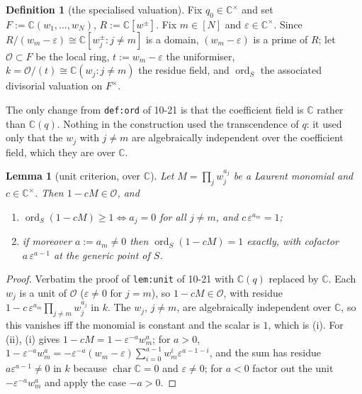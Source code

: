 \documentclass[11pt]{article}
\newtheorem{lem}[thm]{Lemma}
\theoremstyle{definition}
\newtheorem{defn}[thm]{Definition}
\theoremstyle{remark}
\DeclareMathOperator{\ord}{ord}
\begin{document}
\begin{defn}[the specialised valuation]\label{def:ord}
Fix $q_0\in\mathbb{C}^{\times}$ and set $F:=\mathbb{C}(w_1,\dots,w_N)$,
$R:=\mathbb{C}[w^{\pm}]$.  Fix $m\in[N]$ and $\varepsilon\in\mathbb{C}^{\times}$.  Since
$R/(w_m-\varepsilon)\cong\mathbb{C}[w_j^{\pm}:j\ne m]$ is a domain, $(w_m-\varepsilon)$ is
a prime of $R$; let $\mathcal{O}\subset F$ be the local ring, $t:=w_m-\varepsilon$ the
uniformiser, $k=\mathcal{O}/(t)\cong\mathbb{C}(w_j:j\ne m)$ the residue field, and
$\ord_S$ the associated divisorial valuation on $F^{\times}$.
\end{defn}

The only change from \texttt{def:ord} of 10-21 is that the coefficient field is
$\mathbb{C}$ rather than $\mathbb{C}(q)$.  Nothing in the construction used the
transcendence of $q$: it used only that the $w_j$ with $j\ne m$ are algebraically
independent over the coefficient field, which they are over $\mathbb{C}$.

\begin{lem}[unit criterion, over $\mathbb{C}$]\label{lem:unit}
Let $M=\prod_j w_j^{a_j}$ be a Laurent monomial and $c\in\mathbb{C}^{\times}$.  Then
$1-cM\in\mathcal{O}$, and
\begin{enumerate}[label=\textup{(\roman*)},leftmargin=2.2em]
\item $\ord_S(1-cM)\ge1 \iff a_j=0$ for all $j\ne m$, and $c\,\varepsilon^{a_m}=1$;
\item if moreover $a:=a_m\ne0$ then $\ord_S(1-cM)=1$ exactly, with cofactor
  $a\,\varepsilon^{a-1}$ at the generic point of $S$.
\end{enumerate}
\end{lem}

\begin{proof}
Verbatim the proof of \texttt{lem:unit} of 10-21 with $\mathbb{C}(q)$ replaced by
$\mathbb{C}$.  Each $w_j$ is a unit of $\mathcal{O}$ ($\varepsilon\ne0$ for $j=m$), so
$1-cM\in\mathcal{O}$, with residue $1-c\,\varepsilon^{a_m}\prod_{j\ne m}w_j^{a_j}$ in $k$.
The $w_j$, $j\ne m$, are algebraically independent over $\mathbb{C}$, so this vanishes iff
the monomial is constant and the scalar is $1$, which is (i).  For (ii), (i) gives
$1-cM=1-\varepsilon^{-a}w_m^{a}$; for $a>0$,
$1-\varepsilon^{-a}w_m^{a}=-\varepsilon^{-a}(w_m-\varepsilon)\sum_{i=0}^{a-1}w_m^{i}\varepsilon^{a-1-i}$,
and the sum has residue $a\varepsilon^{a-1}\ne0$ in $k$ because
$\operatorname{char}\mathbb{C}=0$ and $\varepsilon\ne0$; for $a<0$ factor out the unit
$-\varepsilon^{-a}w_m^{a}$ and apply the case $-a>0$.
\end{proof}
\end{document}
